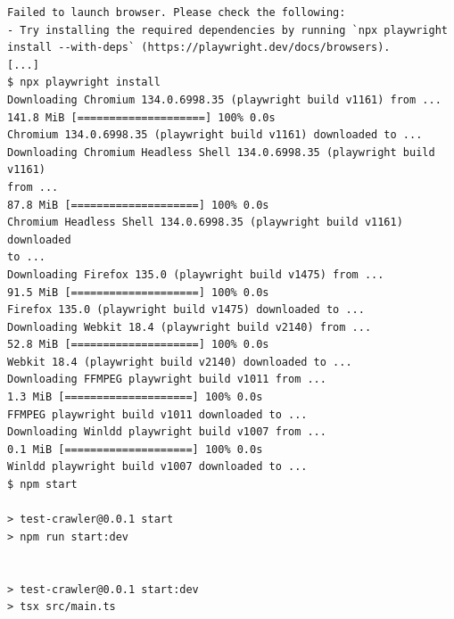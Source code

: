 \begin{verbatim}
Failed to launch browser. Please check the following:
- Try installing the required dependencies by running `npx playwright
install --with-deps` (https://playwright.dev/docs/browsers).
[...]
$ npx playwright install
Downloading Chromium 134.0.6998.35 (playwright build v1161) from ...
141.8 MiB [====================] 100% 0.0s
Chromium 134.0.6998.35 (playwright build v1161) downloaded to ...
Downloading Chromium Headless Shell 134.0.6998.35 (playwright build v1161)
from ...
87.8 MiB [====================] 100% 0.0s
Chromium Headless Shell 134.0.6998.35 (playwright build v1161) downloaded
to ...
Downloading Firefox 135.0 (playwright build v1475) from ...
91.5 MiB [====================] 100% 0.0s
Firefox 135.0 (playwright build v1475) downloaded to ...
Downloading Webkit 18.4 (playwright build v2140) from ...
52.8 MiB [====================] 100% 0.0s
Webkit 18.4 (playwright build v2140) downloaded to ...
Downloading FFMPEG playwright build v1011 from ...
1.3 MiB [====================] 100% 0.0s
FFMPEG playwright build v1011 downloaded to ...
Downloading Winldd playwright build v1007 from ...
0.1 MiB [====================] 100% 0.0s
Winldd playwright build v1007 downloaded to ...
$ npm start

> test-crawler@0.0.1 start
> npm run start:dev


> test-crawler@0.0.1 start:dev
> tsx src/main.ts


\end{verbatim}
